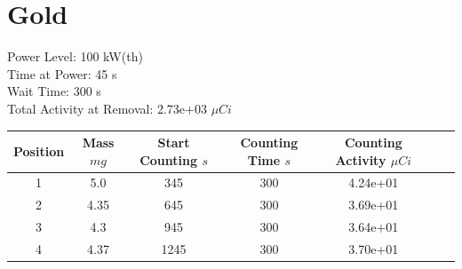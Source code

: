 \newpage

\section*{ Gold }

Power Level: 100 kW(th) \\
Time at Power: 45 s \\
Wait Time: 300 s \\
Total Activity at Removal: 2.73e+03 $\mu Ci$

\begin{table}[h]
\centering
\begin{tabular}{ |c|c|c|c|c|c|c| }
 \hline
 Position & Mass $mg$ & Start Counting $s$ & Counting Time $s$ & Counting Activity $\mu Ci$ \\
 \hline 
 1 & 5.0 & 345 & 300 & 4.24e+01\\ 
\hline
 2 & 4.35 & 645 & 300 & 3.69e+01\\ 
\hline
 3 & 4.3 & 945 & 300 & 3.64e+01\\ 
\hline
 4 & 4.37 & 1245 & 300 & 3.70e+01\\ 
\hline
\end{tabular}
\end{table}

